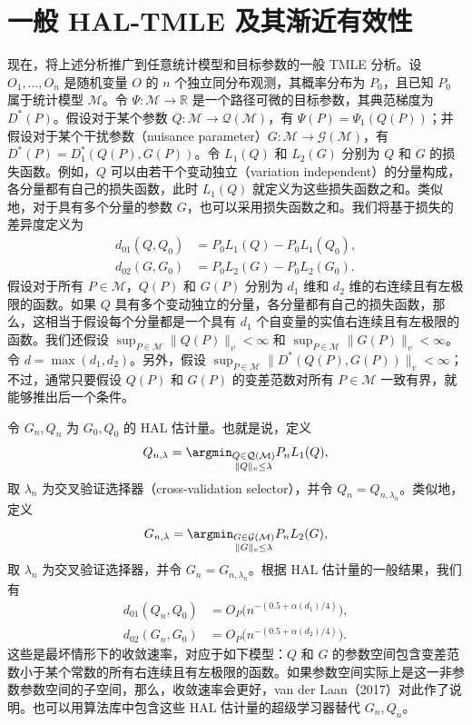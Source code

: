 \section{一般 HAL-TMLE 及其渐近有效性}
\label{sec:ch07-general-hal-tmle}

现在，将上述分析推广到任意统计模型和目标参数的一般 TMLE 分析。设 $O_1,\ldots,O_n$ 是随机变量 $O$ 的 $n$ 个独立同分布观测，其概率分布为 $P_0$，且已知 $P_0$ 属于统计模型 $\mathcal M$。令 $\Psi:\mathcal M\to\mathbb R$ 是一个路径可微的目标参数，其典范梯度为 $D^*(P)$。假设对于某个参数 $Q:\mathcal M\to\mathcal Q(\mathcal M)$，有 $\Psi(P)=\Psi_1(Q(P))$；并假设对于某个干扰参数（nuisance parameter）$G:\mathcal M\to\mathcal G(\mathcal M)$，有 $D^*(P)=D_1^*(Q(P),G(P))$。令 $L_1(Q)$ 和 $L_2(G)$ 分别为 $Q$ 和 $G$ 的损失函数。例如，$Q$ 可以由若干个变动独立（variation independent）的分量构成，各分量都有自己的损失函数，此时 $L_1(Q)$ 就定义为这些损失函数之和。类似地，对于具有多个分量的参数 $G$，也可以采用损失函数之和。我们将基于损失的差异度定义为
\[
 \begin{aligned}
 d_{01}(Q,Q_0)&=P_0L_1(Q)-P_0L_1(Q_0),\\
 d_{02}(G,G_0)&=P_0L_2(G)-P_0L_2(G_0).
 \end{aligned}
\]
假设对于所有 $P\in\mathcal M$，$Q(P)$ 和 $G(P)$ 分别为 $d_1$ 维和 $d_2$ 维的右连续且有左极限的函数。如果 $Q$ 具有多个变动独立的分量，各分量都有自己的损失函数，那么，这相当于假设每个分量都是一个具有 $d_1$ 个自变量的实值右连续且有左极限的函数。我们还假设
$\sup_{P\in\mathcal M}\|Q(P)\|_v<\infty$
和
$\sup_{P\in\mathcal M}\|G(P)\|_v<\infty$。
令 $d=\max(d_1,d_2)$。另外，假设
$\sup_{P\in\mathcal M}\|D^*(Q(P),G(P))\|_v<\infty$；
不过，通常只要假设 $Q(P)$ 和 $G(P)$ 的变差范数对所有 $P\in\mathcal M$ 一致有界，就能够推出后一个条件。

令 $G_n,Q_n$ 为 $G_0,Q_0$ 的 HAL 估计量。也就是说，定义
\[
 Q_{n,\lambda}
 =\argmin_{\substack{Q\in\mathcal Q(\mathcal M)\\\|Q\|_v\leq\lambda}}
 P_nL_1(Q),
\]
取 $\lambda_n$ 为交叉验证选择器（cross-validation selector），并令 $Q_n=Q_{n,\lambda_n}$。类似地，定义
\[
 G_{n,\lambda}
 =\argmin_{\substack{G\in\mathcal G(\mathcal M)\\\|G\|_v\leq\lambda}}
 P_nL_2(G),
\]
取 $\lambda_n$ 为交叉验证选择器，并令 $G_n=G_{n,\lambda_n}$。根据 HAL 估计量的一般结果，我们有
\[
 \begin{aligned}
 d_{01}(Q_n,Q_0)&=O_P\bigl(n^{-(0.5+\alpha(d_1)/4)}\bigr),\\
 d_{02}(G_n,G_0)&=O_P\bigl(n^{-(0.5+\alpha(d_2)/4)}\bigr).
 \end{aligned}
\]
这些是最坏情形下的收敛速率，对应于如下模型：$Q$ 和 $G$ 的参数空间包含变差范数小于某个常数的所有右连续且有左极限的函数。如果参数空间实际上是这一非参数参数空间的子空间，那么，收敛速率会更好，van der Laan（2017）对此作了说明。也可以用算法库中包含这些 HAL 估计量的超级学习器替代 $G_n,Q_n$。


